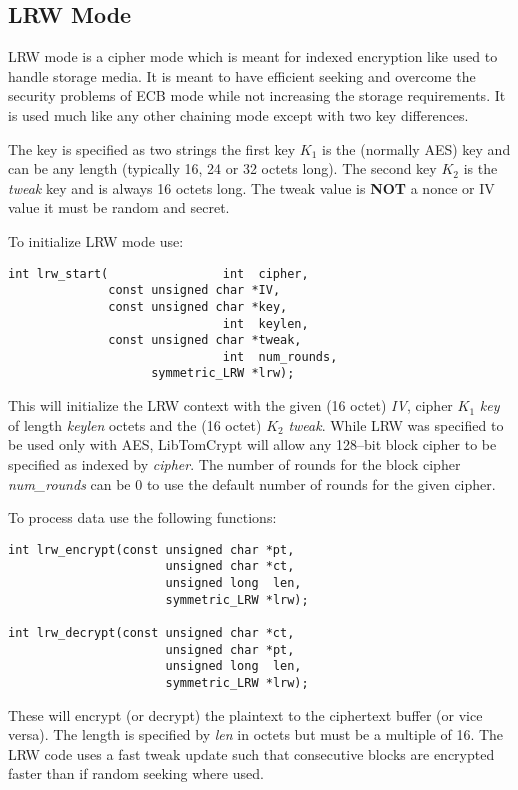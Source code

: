 \documentclass[synpaper]{book}
\begin{document}
\subsection{LRW Mode}
LRW mode is a cipher mode which is meant for indexed encryption like used to handle storage media.  It is meant to have efficient seeking and overcome the
security problems of ECB mode while not increasing the storage requirements.  It is used much like any other chaining mode except with two key differences.

The key is specified as two strings the first key $K_1$ is the (normally AES) key and can be any length (typically 16, 24 or 32 octets long).  The second key
$K_2$ is the \textit{tweak} key and is always 16 octets long.  The tweak value is \textbf{NOT} a nonce or IV value it must be random and secret.

To initialize LRW mode use:

\begin{verbatim}
int lrw_start(                int  cipher,
              const unsigned char *IV,
              const unsigned char *key,
                              int  keylen,
              const unsigned char *tweak,
                              int  num_rounds,
                    symmetric_LRW *lrw);
\end{verbatim}

This will initialize the LRW context with the given (16 octet) \textit{IV}, cipher $K_1$ \textit{key} of length \textit{keylen} octets and the (16 octet) $K_2$ \textit{tweak}.
While LRW was specified to be used only with AES, LibTomCrypt will allow any 128--bit block cipher to be specified as indexed by \textit{cipher}.  The
number of rounds for the block cipher \textit{num\_rounds} can be 0 to use the default number of rounds for the given cipher.

To process data use the following functions:

 
\begin{verbatim}
int lrw_encrypt(const unsigned char *pt,
                      unsigned char *ct,
                      unsigned long  len,
                      symmetric_LRW *lrw);

int lrw_decrypt(const unsigned char *ct,
                      unsigned char *pt,
                      unsigned long  len,
                      symmetric_LRW *lrw);
\end{verbatim}

These will encrypt (or decrypt) the plaintext to the ciphertext buffer (or vice versa).  The length is specified by \textit{len} in octets but must be a multiple
of 16.  The LRW code uses a fast tweak update such that consecutive blocks are encrypted faster than if random seeking where used.
\end{document}
